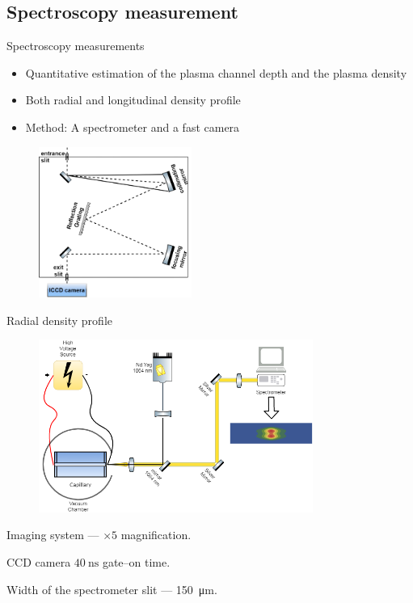 \documentclass[dvipsnames]{beamer}
\begin{document}
\subsection{Spectroscopy measurement}
\begin{frame}{Spectroscopy measurements}
 \begin{itemize}
  \item Quantitative estimation of the plasma channel depth and the plasma density
  \item Both radial and longitudinal density profile
  \item Method: A spectrometer and a fast camera
 \end{itemize}
 \begin{figure}
  \includegraphics[height=140pt]{figures/results/spectro/spectrometer.png}
 \end{figure}
\end{frame}
\begin{frame}{Radial density profile}
 \begin{figure}
\includegraphics[width=0.8\textwidth]{figures/results/spectro/radial_system.png}
 \end{figure}
Imaging system --- $\times 5$ magnification.

CCD camera $\SI{40}{\ns}$ gate--on time. 

Width of the spectrometer slit --- \SI{150}{\um}.
\end{frame}
\end{document}

